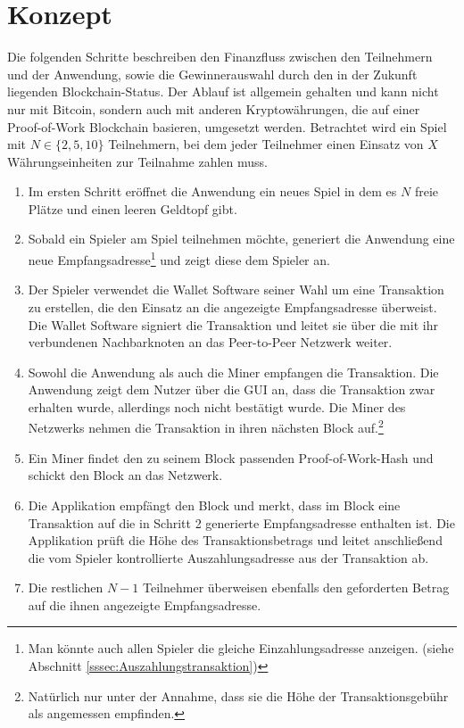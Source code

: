 \section{Konzept}
\label{btc_konzept}
Die folgenden Schritte beschreiben den Finanzfluss zwischen den Teilnehmern und der Anwendung, sowie die Gewinnerauswahl durch den in der Zukunft liegenden Blockchain-Status. Der Ablauf ist allgemein gehalten und kann nicht nur mit Bitcoin, sondern auch mit anderen Kryptowährungen, die auf einer Proof-of-Work Blockchain basieren, umgesetzt werden. Betrachtet wird ein Spiel mit $N \in \{2,5,10\}$ Teilnehmern, bei dem jeder Teilnehmer einen Einsatz von $X$ Währungseinheiten zur Teilnahme zahlen muss. 

\begin{enumerate}
\item Im ersten Schritt eröffnet die Anwendung ein neues Spiel in dem es $N$ freie Plätze und einen leeren Geldtopf gibt.
\item Sobald ein Spieler am Spiel teilnehmen möchte, generiert die Anwendung eine neue Empfangsadresse\footnote{Man könnte auch allen Spieler die gleiche Einzahlungsadresse anzeigen. (siehe Abschnitt \ref{sssec:Auszahlungstransaktion})} und zeigt diese dem Spieler an.
\item Der Spieler verwendet die Wallet Software seiner Wahl um eine Transaktion zu erstellen, die den Einsatz an die angezeigte Empfangsadresse überweist. Die Wallet Software signiert die Transaktion und leitet sie über die mit ihr verbundenen Nachbarknoten an das Peer-to-Peer Netzwerk weiter.
\item Sowohl die Anwendung als auch die Miner empfangen die Transaktion. Die Anwendung zeigt dem Nutzer über die GUI an, dass die Transaktion zwar erhalten wurde, allerdings noch nicht bestätigt wurde. Die Miner des Netzwerks nehmen die Transaktion in ihren nächsten Block auf.\footnote{Natürlich nur unter der Annahme, dass sie die Höhe der Transaktionsgebühr als angemessen empfinden.}
\item Ein Miner findet den zu seinem Block passenden Proof-of-Work-Hash und schickt den Block an das Netzwerk.
\item Die Applikation empfängt den Block und merkt, dass im Block eine Transaktion auf die in Schritt 2 generierte Empfangsadresse enthalten ist. Die Applikation prüft die Höhe des Transaktionsbetrags und leitet anschließend die vom Spieler kontrollierte Auszahlungsadresse aus der Transaktion ab. 
\item  Die restlichen $N-1$ Teilnehmer überweisen ebenfalls den geforderten Betrag auf die ihnen angezeigte Empfangsadresse.

\end{enumerate}
